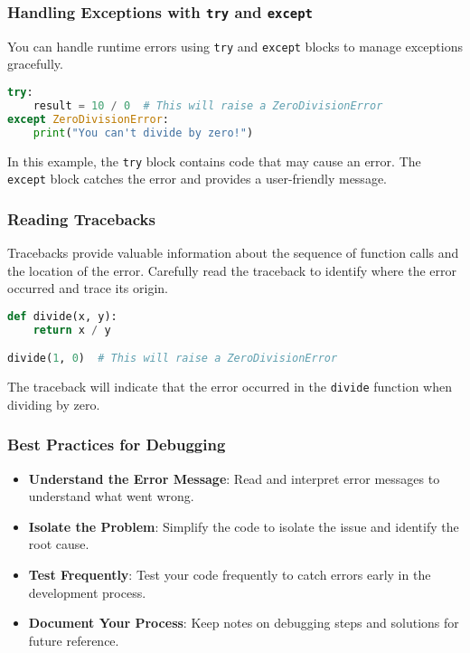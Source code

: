 \subsubsection{Handling Exceptions with \texttt{try} and \texttt{except}}

You can handle runtime errors using \texttt{try} and \texttt{except} blocks to manage exceptions gracefully.

\begin{lstlisting}[language=Python, caption=Exception Handling Example]
try:
    result = 10 / 0  # This will raise a ZeroDivisionError
except ZeroDivisionError:
    print("You can't divide by zero!")
\end{lstlisting}

In this example, the \texttt{try} block contains code that may cause an error. The \texttt{except} block catches the error and provides a user-friendly message.

\subsubsection{Reading Tracebacks}

Tracebacks provide valuable information about the sequence of function calls and the location of the error. Carefully read the traceback to identify where the error occurred and trace its origin.

\begin{lstlisting}[language=Python, caption=Traceback Example]
def divide(x, y):
    return x / y

divide(1, 0)  # This will raise a ZeroDivisionError
\end{lstlisting}

The traceback will indicate that the error occurred in the \texttt{divide} function when dividing by zero.

\subsubsection{Best Practices for Debugging}

\begin{itemize}

    \item \textbf{Understand the Error Message}: Read and interpret error messages to understand what went wrong.
    \item \textbf{Isolate the Problem}: Simplify the code to isolate the issue and identify the root cause.
    \item \textbf{Test Frequently}: Test your code frequently to catch errors early in the development process.
    \item \textbf{Document Your Process}: Keep notes on debugging steps and solutions for future reference.
\end{itemize}

